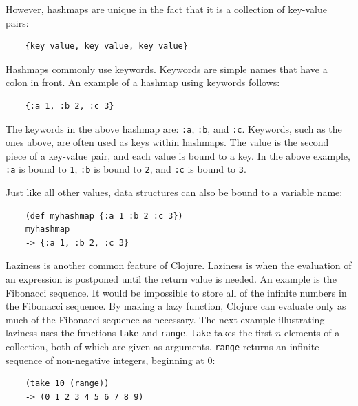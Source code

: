 \documentclass[12pt]{article}
\newcommand{\comment}[1]{{\bf \tt  {#1}}}
\newcommand{\emcomment}[1]{\textcolor{ForestGreen}{\comment{Elena: {#1}}}}
\begin{document}
However, hashmaps are unique in the fact that it is a collection of key-value pairs: 
\begin{verbatim}
	{key value, key value, key value}
\end{verbatim}

Hashmaps commonly use keywords. Keywords are simple names that have a colon in front.
An example of a hashmap using keywords follows: 
\begin{verbatim}
	{:a 1, :b 2, :c 3}
\end{verbatim}

The keywords in the above hashmap are: \texttt{:a}, \texttt{:b}, and \texttt{:c}. Keywords, such as the
ones above, are often used as keys within hashmaps. The value is the second piece of a key-value pair,
and each value is bound to a key. In the above example, \texttt{:a} is bound to \texttt{1},
\texttt{:b} is bound to \texttt{2}, and \texttt{:c} is bound to \texttt{3}.

Just like all other values, data structures can also be bound to a
variable name: 
\begin{verbatim}
	(def myhashmap {:a 1 :b 2 :c 3})
	myhashmap
	-> {:a 1, :b 2, :c 3}
\end{verbatim}

Laziness is another common feature of Clojure. Laziness is when the evaluation of an expression is
postponed until the return value is needed. An example is the Fibonacci sequence.
It would be impossible to store all of the infinite numbers in the Fibonacci sequence. By making a lazy
function, Clojure can
evaluate only as much of the Fibonacci sequence as necessary. The next example illustrating laziness 
uses the functions 
\texttt{take} and \texttt{range}. \texttt{take} takes the first $n$ elements of a collection, both of
which are given as arguments. \texttt{range} returns an infinite sequence of non-negative
integers, beginning at 0:
\begin{verbatim}
	(take 10 (range))
	-> (0 1 2 3 4 5 6 7 8 9)
\end{verbatim}
\end{document}
